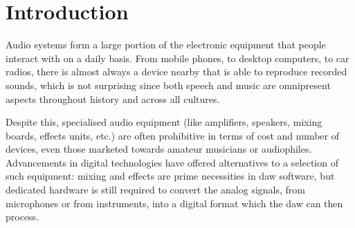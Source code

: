 
\emptypage\tableofcontents

\emptypage\listoffigures

\emptypage\listoftables



\pagestyle{plain}
\chapter{Introduction}

Audio systems form a large portion of the electronic equipment that people
interact with on a daily basis. From mobile phones, to desktop computers, to
car radios, there is almost always a device nearby that is able to reproduce
recorded sounds, which is not surprising since both speech and music are
omnipresent aspects throughout history and across all cultures.

Despite this, specialised audio equipment (like amplifiers, speakers, mixing
boards, effects units, etc.) are often prohibitive in terms of cost and number
of devices, even those marketed towards amateur musicians or audiophiles.
Advancements in digital technologies have offered alternatives to a selection
of such equipment: mixing and effects are prime necessities in \ac{daw}
software, but dedicated hardware is still required to convert the analog
signals, from microphones or from instruments, into a digital format which the
\ac{daw} can then process.

